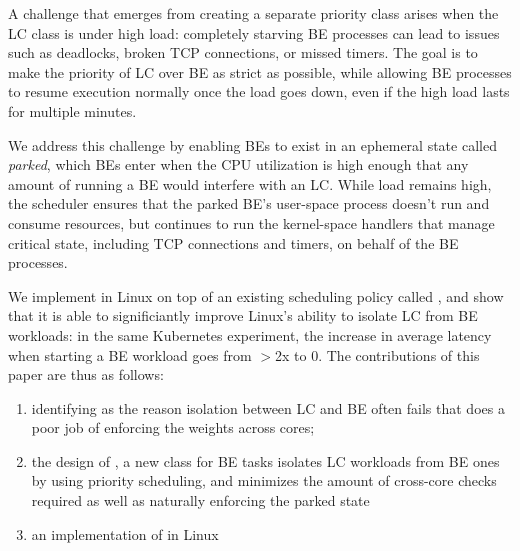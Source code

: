 A challenge that emerges from creating a separate priority class arises when the
LC class is under high load: completely starving BE processes can lead to issues
such as deadlocks, broken TCP connections, or missed timers. The goal is to make the
priority of LC over BE as strict as possible, while allowing BE processes to
resume execution normally once the load goes down, even if the high load lasts
for multiple minutes.

We address this challenge by enabling BEs to exist in an ephemeral state called
\textit{parked}, which BEs enter when the CPU utilization is high enough that
any amount of running a BE would interfere with an LC. While load remains high,
the scheduler ensures that the parked BE's user-space process doesn't run and
consume resources, but continues to run the kernel-space handlers that manage
critical state, including TCP connections and timers, on behalf of the BE
processes. 

We implement \beclass{} in Linux on top of an existing scheduling policy called
\schedidle{}, and show that it is able to significiantly improve Linux's ability
to isolate LC from BE workloads: in the same Kubernetes experiment, the increase
in average latency when starting a BE workload goes from $>$2x to 0. The
contributions of this paper are thus as follows: 
\begin{enumerate}
    \item identifying as the reason isolation between LC and BE often fails that
    \cgroups{} does a poor job of enforcing the weights across cores;
    \item the design of \beclass{}, a new class for BE tasks isolates LC
    workloads from BE ones by using priority scheduling, and minimizes the
    amount of cross-core checks required as well as naturally enforcing the
    parked state
    \item an implementation of \beclass{} in Linux
\end{enumerate}
